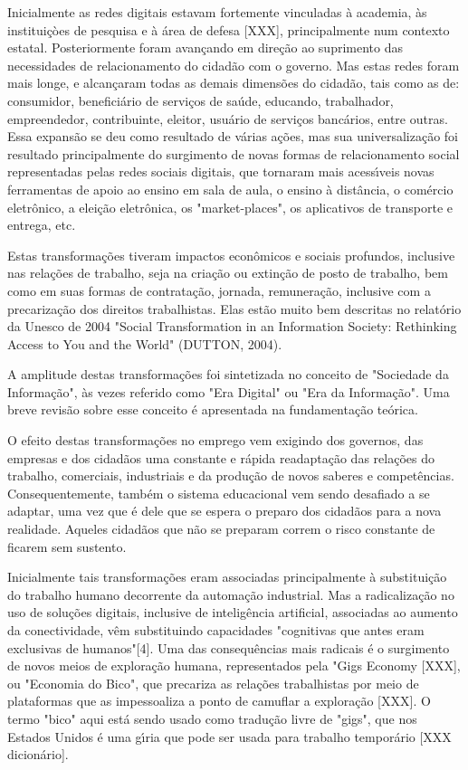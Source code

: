 \documentclass[
12pt,		%
openright,	%
twoside,  %
a4paper,			%
chapter=TITLE,		%
english,			%
french,				%
spanish,			%
brazil				%
]{USPSC-classe/USPSC}
\begin{document}
Inicialmente as redes digitais estavam fortemente vinculadas \`a academia, \`as institui\c{c}òes de pesquisa e \`a \'area de defesa [XXX], principalmente num contexto estatal.  Posteriormente foram avan\c{c}ando em dire\c{c}\~ao ao suprimento das necessidades de relacionamento do cidad\~ao com o governo. Mas estas redes foram mais longe, e alcan\c{c}aram todas as demais dimens\~oes do cidad\~ao, tais como as de: consumidor, benefici\'ario de servi\c{c}os de sa\'ude, educando, trabalhador, empreendedor, contribuinte, eleitor, usu\'ario de servi\c{c}os banc\'arios, entre outras.  Essa expans\~ao se deu como resultado de v\'arias a\c{c}\~oes, mas sua universaliza\c{c}\~ao foi resultado principalmente do surgimento de novas formas de relacionamento social representadas pelas redes sociais digitais, que tornaram mais acess\'{\i}veis novas ferramentas de apoio ao ensino em sala de aula, o ensino \`a dist\^ancia, o com\'ercio eletr\^onico, a elei\c{c}\~ao eletr\^onica, os "market-places", os aplicativos de transporte e entrega, etc.


Estas transforma\c{c}\~oes tiveram impactos econ\^omicos e sociais profundos, inclusive nas rela\c{c}\~oes de trabalho, seja na cria\c{c}\~ao ou extin\c{c}\~ao de posto de trabalho, bem como em suas formas de contrata\c{c}\~ao, jornada, remunera\c{c}\~ao, inclusive com a precariza\c{c}\~ao dos direitos trabalhistas. Elas est\~ao muito bem descritas  no relat\'orio da Unesco  de 2004 "Social Transformation in an Information Society: Rethinking Access to You and the World" (DUTTON, 2004).


A amplitude destas transforma\c{c}\~oes foi sintetizada no conceito de "Sociedade da Informa\c{c}\~ao", \`as vezes referido como "Era Digital" ou "Era da Informa\c{c}\~ao". Uma breve revis\~ao sobre esse conceito \'e apresentada na fundamenta\c{c}\~ao te\'orica.


O efeito destas transforma\c{c}\~oes no emprego vem exigindo dos governos, das empresas e dos cidad\~aos uma constante e r\'apida readapta\c{c}\~ao  das rela\c{c}\~oes do trabalho, comerciais, industriais e da produ\c{c}\~ao de novos saberes e compet\^encias. Consequentemente, tamb\'em o sistema educacional vem sendo desafiado a se adaptar, uma vez que \'e dele que se espera o preparo dos cidad\~aos para a nova realidade. Aqueles cidad\~aos que n\~ao se preparam correm o risco constante de ficarem sem sustento.


Inicialmente tais transforma\c{c}\~oes eram associadas principalmente \`a substitui\c{c}\~ao do trabalho humano decorrente da automa\c{c}\~ao industrial. Mas a radicaliza\c{c}\~ao no uso de solu\c{c}\~oes digitais, inclusive de intelig\^encia artificial, associadas ao aumento da conectividade, v\^em substituindo capacidades "cognitivas que antes eram exclusivas de humanos"[4]. Uma das consequ\^encias mais radicais \'e o surgimento de novos meios de explora\c{c}\~ao humana, representados pela "Gigs Economy [XXX], ou "Economia do Bico", que precariza as rela\c{c}\~oes trabalhistas por meio de plataformas que as impessoaliza a ponto de camuflar a explora\c{c}\~ao [XXX]. O termo "bico" aqui est\'a sendo usado como tradu\c{c}\~ao livre de "gigs", que nos Estados Unidos \'e uma g\'{\i}ria que pode ser usada para trabalho tempor\'ario [XXX dicion\'ario].
\end{document}
